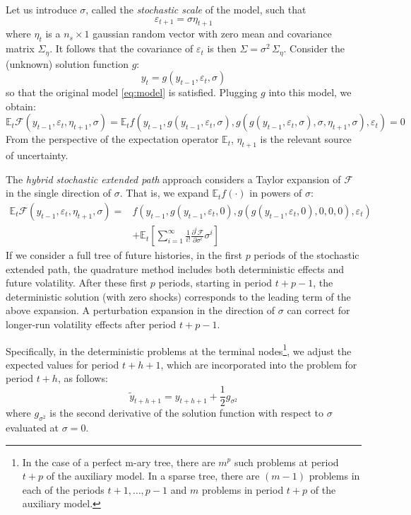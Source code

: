 \documentclass[a4paper,11pt]{amsart}
\begin{document}
Let us introduce $\sigma$, called the \emph{stochastic scale} of the model, such that
\[
   \varepsilon_{t+1} = \sigma \eta_{t+1}
\]
where $\eta_t$ is a $n_s\times 1$ gaussian random vector with zero mean
and covariance matrix $\Sigma_{\eta}$. It follows that the covariance of $\varepsilon_{t}$
is then $\Sigma = \sigma^2 \,\Sigma_{\eta}$. Consider the (unknown) solution function $g$:
\[
   y_t = g\left(y_{t-1}, \varepsilon_t, \sigma\right)
\]
so that the original model \eqref{eq:model} is satisfied. Plugging $g$ into this model, we obtain:
\[
   \mathbb E_t\mathcal F\left( y_{t-1}, \varepsilon_t, \eta_{t+1}, \sigma\right)
   =
   \mathbb E_t f\left(
   y_{t-1},
   g\left(y_{t-1},\varepsilon_t,\sigma\right),
   g\left(g\left(y_{t-1}, \varepsilon_t,\sigma\right), \sigma, \eta_{t+1}, \sigma\right),
   \varepsilon_t\right) = 0
\]
From the perspective of the expectation operator $\mathbb E_t$, $\eta_{t+1}$ is the relevant source of uncertainty.\newline

The \emph{hybrid stochastic extended path} approach considers a Taylor expansion
of $\mathcal F$ in the single direction of $\sigma$. That is, we expand
$\mathbb E_t f(\cdot)$ in powers of $\sigma$:
\[
   \begin{split}
      \mathbb E_t\mathcal F\left( y_{t-1}, \varepsilon_t, \eta_{t+1}, \sigma\right) =
       & f\left(y_{t-1}, g\left(y_{t-1},\varepsilon_t,0\right),
      g\left(g\left(y_{t-1}, \varepsilon_t,0\right), 0, 0, 0\right),
      \varepsilon_t\right)                                                                                             \\
       & +\mathbb E_t\left[\sum_{i=1}^{\infty}\frac{1}{i!}\frac{\partial^i\mathcal F}{\partial\sigma^i}\sigma^i\right]
   \end{split}
\]
If we consider a full tree of future histories, in the first $p$
periods of the stochastic extended path, the quadrature method
includes both deterministic effects and future volatility. After these
first $p$ periods, starting in period $t+p-1$, the deterministic
solution (with zero shocks) corresponds to the leading term of the
above expansion.  A perturbation expansion in the direction
of $\sigma$ can correct for longer-run volatility effects after
period $t+p-1$.\newline

Specifically, in the deterministic problems at the terminal
nodes\footnote{In the case of a perfect m-ary tree, there are $m^p$
   such problems at period $t+p$ of the auxiliary model. In a sparse
   tree, there are $(m-1)$ problems in each of the
   periods $t+1,\ldots,p-1$ and $m$ problems in period $t+p$ of the
   auxiliary model.}, we adjust the expected values for period $t+h+1$,
which are incorporated into the problem for period $t+h$, as
follows:
\[
   \widetilde{y}_{t+h+1}
   = y_{t+h+1}
   +
   \frac{1}{2}g_{\sigma^2}
\]
where $g_{\sigma^2}$ is the second derivative of the solution
function with respect to $\sigma$ evaluated at $\sigma = 0$.\newline
\end{document}
